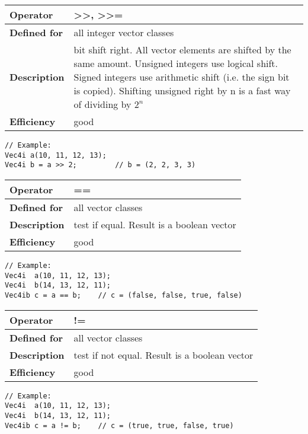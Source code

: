 \documentclass[vcl_manual.tex]{subfiles}
\begin{document}
\begin{tabular}{|p{25mm}|p{100mm}|}
\hline
\bfseries Operator & \textgreater\textgreater, \textgreater\textgreater= \\ \hline
\bfseries Defined for & all integer vector classes \\ \hline
\bfseries Description & bit shift right. All vector elements are shifted by the same amount.\newline
Unsigned integers use logical shift. \newline
Signed integers use arithmetic shift (i.e. the sign bit is copied). \newline
Shifting unsigned right by n is a fast way of dividing by $2^n$ 
 \\ \hline
\bfseries Efficiency & good \\ \hline
\end{tabular}
\begin{lstlisting}[frame=none]
// Example:
Vec4i a(10, 11, 12, 13);
Vec4i b = a >> 2;         // b = (2, 2, 3, 3)
\end{lstlisting}


\begin{tabular}{|p{25mm}|p{100mm}|}
\hline
\bfseries Operator & == \\ \hline
\bfseries Defined for & all vector classes \\ \hline
\bfseries Description & test if equal. Result is a boolean vector \\ \hline
\bfseries Efficiency & good \\ \hline
\end{tabular}
\begin{lstlisting}[frame=none]
// Example:
Vec4i  a(10, 11, 12, 13);
Vec4i  b(14, 13, 12, 11);
Vec4ib c = a == b;    // c = (false, false, true, false)
\end{lstlisting}


\begin{tabular}{|p{25mm}|p{100mm}|}
\hline
\bfseries Operator & != \\ \hline
\bfseries Defined for & all vector classes \\ \hline
\bfseries Description & test if not equal. Result is a boolean vector \\ \hline
\bfseries Efficiency & good \\ \hline
\end{tabular}
\begin{lstlisting}[frame=none]
// Example:
Vec4i  a(10, 11, 12, 13);
Vec4i  b(14, 13, 12, 11);
Vec4ib c = a != b;    // c = (true, true, false, true)
\end{lstlisting}
\end{document}
